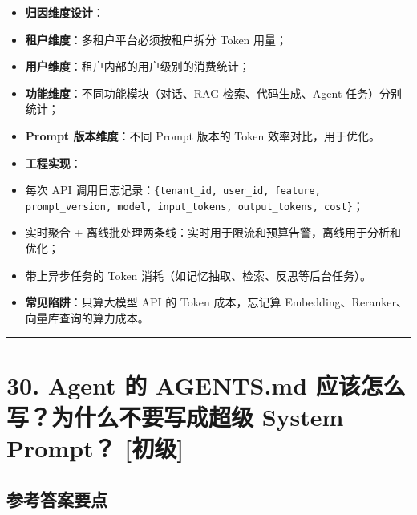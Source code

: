 \documentclass[9pt,a4paper,twocolumn]{ctexart}
\newcommand{\lvchu}{\usebox{\badgechubox}}
\def\lvchu{[初级]}%
\begin{document}
\begin{itemize}[itemsep=1pt, topsep=2pt]
  \item \textbf{归因维度设计}：
  \item \textbf{租户维度}：多租户平台必须按租户拆分 Token 用量；
  \item \textbf{用户维度}：租户内部的用户级别的消费统计；
  \item \textbf{功能维度}：不同功能模块（对话、RAG 检索、代码生成、Agent 任务）分别统计；
  \item \textbf{Prompt 版本维度}：不同 Prompt 版本的 Token 效率对比，用于优化。
  \item \textbf{工程实现}：
  \item 每次 API 调用日志记录：\texttt{\{tenant\_id, user\_id, feature, prompt\_version, model, input\_tokens, output\_tokens, cost\}}；
  \item 实时聚合 + 离线批处理两条线：实时用于限流和预算告警，离线用于分析和优化；
  \item 带上异步任务的 Token 消耗（如记忆抽取、检索、反思等后台任务）。
  \item \textbf{常见陷阱}：只算大模型 API 的 Token 成本，忘记算 Embedding、Reranker、向量库查询的算力成本。
\end{itemize}


\vspace{2pt}
\noindent\rule{\columnwidth}{0.3pt}\vspace{2pt}



\section*{30. Agent 的 AGENTS.md 应该怎么写？为什么不要写成超级 System Prompt？ \lvchu{}}


\subsection*{参考答案要点}
\end{document}
